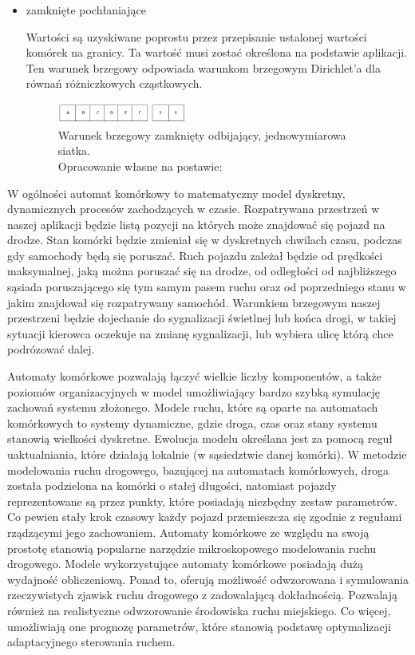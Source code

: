 \documentclass{sprawozdanie-agh}
\begin{document}
\begin{itemize}
				\item zamknięte pochłaniające
				
				Wartości są uzyskiwane poprostu przez przepisanie ustalonej wartości komórek na granicy. Ta wartość musi zostać określona na podstawie aplikacji. Ten warunek brzegowy odpowiada warunkom brzegowym Dirichlet'a dla równań różniczkowych cząstkowych.

				\begin{figure}[H]
					\centering
					\captionsetup{justification=centering}
					  \includegraphics[width=0.4\textwidth]{zamknietePoch}
					\caption{Warunek brzegowy zamknięty odbijający, jednowymiarowa siatka. \\ Opracowanie własne na postawie: \cite{warunkiBrzegowe}}
					\label{fig:closedPoch}
				\end{figure}

			\end{itemize}



		W ogólności automat komórkowy to matematyczny model dyskretny, dynamicznych procesów zachodzących w czasie. Rozpatrywana przestrzeń w naszej aplikacji będzie listą pozycji na których może znajdować się pojazd na drodze. Stan komórki będzie zmieniał się w dyskretnych chwilach czasu, podczas gdy samochody będą się poruszać. Ruch pojazdu zależał będzie od prędkości maksymalnej, jaką można poruszać się na drodze, od odległości od najbliższego sąsiada poruszającego się tym samym pasem ruchu oraz od poprzedniego stanu w jakim znajdował się rozpatrywany samochód. Warunkiem brzegowym naszej przestrzeni będzie dojechanie do sygnalizacji świetlnej lub końca drogi, w takiej sytuacji kierowca oczekuje na zmianę sygnalizacji, lub wybiera ulicę którą chce podrózować dalej.

		Automaty komórkowe pozwalają łączyć wielkie liczby komponentów, a także poziomów organizacyjnych w model umożliwiający bardzo szybką symulację zachowań systemu złożonego. Modele ruchu, które są oparte na automatach komórkowych to systemy dynamiczne, gdzie droga, czas oraz stany systemu stanowią wielkości dyskretne. Ewolucja modelu określana jest za pomocą reguł uaktualniania, które działają lokalnie (w sąsiedztwie danej komórki). W metodzie modelowania ruchu drogowego, bazującej na automatach komórkowych, droga została podzielona na komórki o stałej długości, natomiast pojazdy reprezentowane są przez punkty, które posiadają niezbędny zestaw parametrów. Co pewien stały krok czasowy każdy pojazd przemieszcza się zgodnie z regułami rządzącymi jego zachowaniem. Automaty komórkowe ze względu na swoją prostotę stanowią popularne narzędzie mikroskopowego modelowania ruchu drogowego. Modele wykorzystujące automaty komórkowe posiadają dużą wydajność obliczeniową. Ponad to, oferują możliwość odwzorowana i symulowania rzeczywistych zjawisk ruchu drogowego z zadowalającą dokładnością. Pozwalają również na realistyczne odwzorowanie środowiska ruchu miejskiego. Co więcej, umożliwiają one prognozę parametrów, które stanowią podstawę optymalizacji adaptacyjnego sterowania ruchem.
\end{document}
